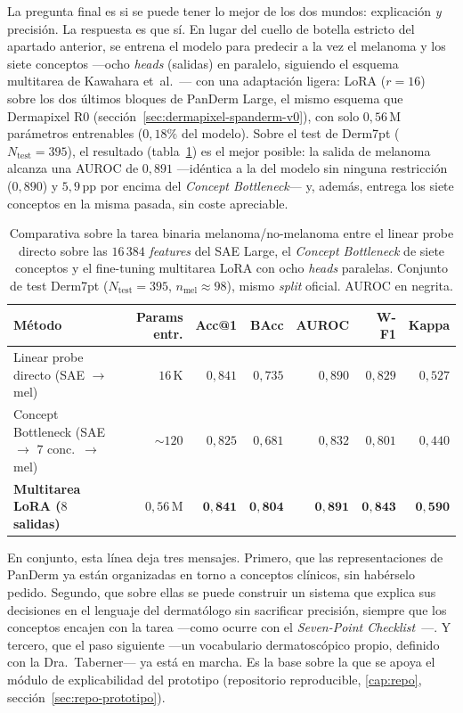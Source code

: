 La pregunta final es si se puede tener lo mejor de los dos mundos:
explicación \emph{y} precisión. La respuesta es que sí. En lugar del
cuello de botella estricto del apartado anterior, se entrena el modelo
para predecir a la vez el melanoma y los siete conceptos ---ocho
\emph{heads} (salidas) en paralelo, siguiendo el esquema multitarea de
Kawahara et~al.~\cite{kawahara2019}--- con una adaptación ligera: LoRA
($r = 16$) sobre los dos últimos bloques de PanDerm Large, el mismo
esquema que Dermapixel R0 (sección~\ref{sec:dermapixel-spanderm-v0}),
con solo $0{,}56$\,M parámetros entrenables ($0{,}18\%$ del modelo).
Sobre el test de Derm7pt ($N_{\mathrm{test}} = 395$), el resultado
(tabla~\ref{tab:sae-d7pt-e4-comp}) es el mejor posible: la salida de
melanoma alcanza una AUROC de $0{,}891$ ---idéntica a la del modelo sin
ninguna restricción ($0{,}890$) y $5{,}9$\,pp por encima del
\emph{Concept Bottleneck}--- y, además, entrega los siete conceptos en
la misma pasada, sin coste apreciable.

\begin{table}[htbp]
\centering
\footnotesize
\setlength{\tabcolsep}{4pt}
\renewcommand{\arraystretch}{0.95}
\caption{Comparativa sobre la tarea binaria melanoma/no-melanoma
entre el linear probe directo sobre las $16\,384$ \emph{features}
del SAE Large, el \emph{Concept Bottleneck} de siete conceptos y el
fine-tuning multitarea LoRA con ocho \emph{heads} paralelas. Conjunto
de test Derm7pt ($N_{\mathrm{test}} = 395$, $n_{\mathrm{mel}} \approx
98$), mismo \emph{split} oficial. AUROC en negrita.}
\label{tab:sae-d7pt-e4-comp}
\begin{tabular}{lrrrrrr}
\hline
Método                                       & Params entr. & Acc@1     & BAcc      & AUROC              & W-F1      & Kappa     \\
\hline
Linear probe directo (SAE $\to$ mel)          & $16$\,K       & $0{,}841$ & $0{,}735$ & $0{,}890$          & $0{,}829$ & $0{,}527$ \\
Concept Bottleneck (SAE $\to$ $7$ conc.\ $\to$ mel) & $\sim 120$ & $0{,}825$ & $0{,}681$ & $0{,}832$          & $0{,}801$ & $0{,}440$ \\
\textbf{Multitarea LoRA ($8$ salidas)}        & $0{,}56$\,M   & $\mathbf{0{,}841}$ & $\mathbf{0{,}804}$ & $\mathbf{0{,}891}$ & $\mathbf{0{,}843}$ & $\mathbf{0{,}590}$ \\
\hline
\end{tabular}
\end{table}

En conjunto, esta línea deja tres mensajes. Primero, que las
representaciones de PanDerm ya están organizadas en torno a conceptos
clínicos, sin habérselo pedido. Segundo, que sobre ellas se puede
construir un sistema que explica sus decisiones en el lenguaje del
dermatólogo sin sacrificar precisión, siempre que los conceptos encajen
con la tarea ---como ocurre con el \emph{Seven-Point
Checklist}~\cite{kawahara2019}---. Y tercero, que el paso siguiente
---un vocabulario dermatoscópico propio, definido con la
Dra.~Taberner--- ya está en marcha. Es la base sobre la que se apoya el
módulo de explicabilidad del prototipo (repositorio reproducible,
\ref{cap:repo}, sección~\ref{sec:repo-prototipo}).
